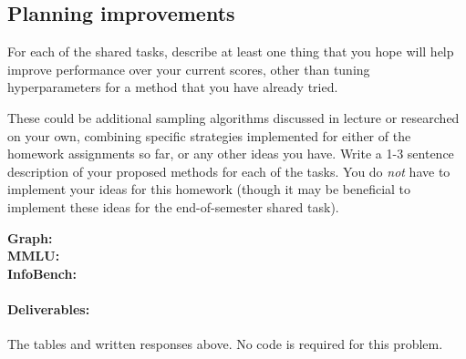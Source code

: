 \documentclass{article}
\begin{document}
\subsection{Planning improvements}
For each of the shared tasks, describe at least one thing that you hope will help improve performance over your current scores, other than tuning hyperparameters for a method that you have already tried. 

These could be additional sampling algorithms discussed in lecture or researched on your own, combining specific strategies implemented for either of the homework assignments so far, or any other ideas you have. Write a 1-3 sentence description of your proposed methods for each of the tasks. You do \textit{not} have to implement your ideas for this homework (though it may be beneficial to implement these ideas for the end-of-semester shared task). 

\begin{solve}
    \textbf{Graph:}\\

    \textbf{MMLU:} \\
    
    \textbf{InfoBench:}
\end{solve}


\paragraph{Deliverables:} The tables and written responses above. No code is required for this problem. 



\end{document}
